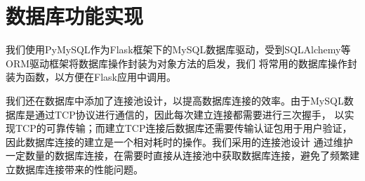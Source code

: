 \section{数据库功能实现}

我们使用PyMySQL作为Flask框架下的MySQL数据库驱动，受到SQLAlchemy等ORM驱动框架将数据库操作封装为对象方法的启发，我们
将常用的数据库操作封装为函数，以方便在Flask应用中调用。

我们还在数据库中添加了连接池设计，以提高数据库连接的效率。由于MySQL数据库是通过TCP协议进行通信的，因此每次建立连接都需要进行三次握手，
以实现TCP的可靠传输；而建立TCP连接后数据库还需要传输认证包用于用户验证，因此数据库连接的建立是一个相对耗时的操作。我们采用的连接池设计
通过维护一定数量的数据库连接，在需要时直接从连接池中获取数据库连接，避免了频繁建立数据库连接带来的性能问题。